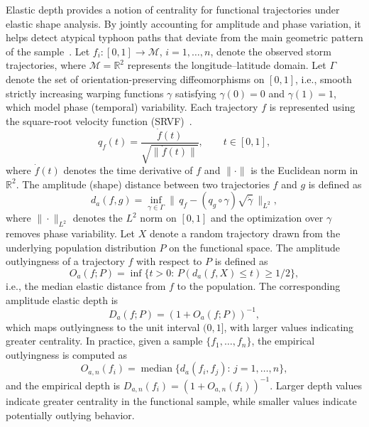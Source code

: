 \documentclass{article}
\begin{document}
Elastic depth provides a notion of centrality for functional trajectories under elastic shape analysis. By jointly accounting for amplitude and phase variation, it helps detect atypical typhoon paths that deviate from the main geometric pattern of the sample~\cite{harris2018elastic}. Let $f_i:[0,1]\to\mathcal{M}$, $i=1,\dots,n$, denote the observed storm trajectories, where $\mathcal{M}=\mathbb{R}^2$ represents the longitude--latitude domain. Let $\Gamma$ denote the set of orientation-preserving diffeomorphisms on $[0,1]$, i.e., smooth strictly increasing warping functions $\gamma$ satisfying $\gamma(0)=0$ and $\gamma(1)=1$, which model phase (temporal) variability. Each trajectory $f$ is represented using the square-root velocity function (SRVF)~\cite{srivastava2011elastic}.
\[
q_f(t)=\frac{\dot f(t)}{\sqrt{\|\dot f(t)\|}}, \qquad t\in[0,1],
\]
where $\dot f(t)$ denotes the time derivative of $f$ and $\|\cdot\|$ is the Euclidean norm in $\mathbb{R}^2$. The amplitude (shape) distance between two trajectories $f$ and $g$ is defined as
\[
d_a(f,g)=\inf_{\gamma\in\Gamma}\|\,q_f-(q_g\circ\gamma)\sqrt{\dot\gamma}\,\|_{L^2},
\]
where $\|\cdot\|_{L^2}$ denotes the $L^2$ norm on $[0,1]$ and the optimization over $\gamma$ removes phase variability. Let $X$ denote a random trajectory drawn from the underlying population distribution $P$ on the functional space. The amplitude outlyingness of a trajectory $f$ with respect to $P$ is defined as
\[
O_a(f;P)=\inf\{t>0:\,P(d_a(f,X)\le t)\ge 1/2\},
\]
i.e., the median elastic distance from $f$ to the population. The corresponding amplitude elastic depth is
\[
D_a(f;P)=(1+O_a(f;P))^{-1},
\]
which maps outlyingness to the unit interval $(0,1]$, with larger values indicating greater centrality. In practice, given a sample $\{f_1,\dots,f_n\}$, the empirical outlyingness is computed as
\[
O_{a,n}(f_i)=\operatorname{median}\{d_a(f_i,f_j):\,j=1,\dots,n\},
\]
and the empirical depth is $D_{a,n}(f_i)=(1+O_{a,n}(f_i))^{-1}$. Larger depth values indicate greater centrality in the functional sample, while smaller values indicate potentially outlying behavior. 
\end{document}
